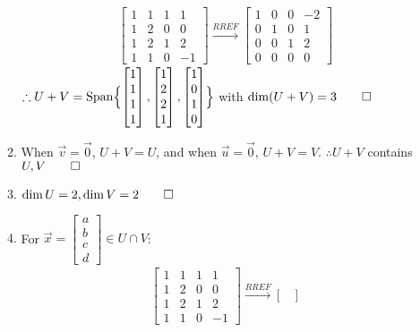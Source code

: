 \documentclass[12pt, a4paper]{article}
\begin{document}
\begin{enumerate}[Q\arabic*.]
\begin{enumerate}[(\alph*)]
        \begin{align*}
          \begin{bmatrix}
            1&1&1&1\\
            1&2&0&0\\
            1&2&1&2\\
            1&1&0&-1
          \end{bmatrix}\xrightarrow{RREF}
          \begin{bmatrix}
            1&0&0&-2\\
            0&1&0&1\\
            0&0&1&2\\
            0&0&0&0
          \end{bmatrix}
        \end{align*}
        $\therefore U+V = \operatorname{Span}\Bigl\{ \begin{bmatrix}1\\1\\1\\1\end{bmatrix}, \begin{bmatrix}1\\2\\2\\1\end{bmatrix}, \begin{bmatrix}1\\0\\1\\0\end{bmatrix}\Bigr\}$ with $\dim(U+V) = 3 \qed$
      \item When $\vec{v} = \vec{0}$, $U + V = U$, and when $\vec{u} = \vec{0}$, $U+V = V$. $\therefore U+V$ contains $U, V \qed$
      \item $\dim U = 2, \dim V = 2 \qed$
      \item For $\vec{x} = \begin{bmatrix}a\\b\\c\\d\end{bmatrix} \in U\cap V$:
        \begin{align*}
          \begin{bmatrix}
            1&1&1&1\\
            1&2&0&0\\
            1&2&1&2\\
            1&1&0&-1
          \end{bmatrix}\xrightarrow{RREF}
          \begin{bmatrix}

\end{bmatrix}
\end{align*}
\end{enumerate}
\end{enumerate}
\end{document}
